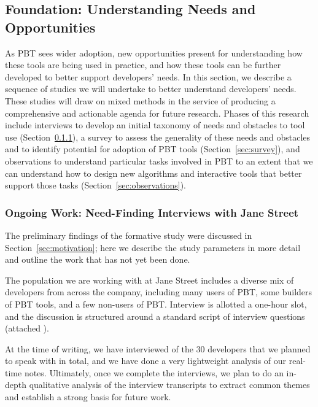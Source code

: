 \subsection{Foundation: Understanding Needs and Opportunities }

As PBT sees wider adoption, new opportunities present for understanding how
these tools are being used in practice, and how these tools can be further
developed to better support developers' needs. In this section, we describe a
sequence of studies we will undertake to better understand developers' needs.
These studies will draw on mixed methods in the service of producing a
comprehensive and actionable agenda for future research.  Phases of this
research include interviews to develop an initial taxonomy of needs and
obstacles to tool use (Section~\ref{sec:interviews}), a survey to assess the
generality of these needs and obstacles and to identify potential for adoption
of PBT tools (Section~\ref{sec:survey}), and observations to understand
particular tasks involved in PBT to an extent that we can understand how to
design new algorithms and interactive tools that better support those tasks
(Section~\ref{sec:observations}).

\subsubsection{Ongoing Work: Need-Finding Interviews with Jane Street}
\label{sec:interviews}

The preliminary findings of the formative study were discussed in
Section~\ref{sec:motivation}; here we describe the study parameters in more
detail and outline the work that has not yet been done.

The population we are working with at Jane Street includes a diverse mix of
developers from across the company, including many users of PBT, some builders
of PBT tools, and a few non-users of PBT. Interview is allotted a one-hour slot,
and the discussion is structured around a standard script of interview questions
(attached ).


At the time of writing, we have interviewed  of the 30 developers that we
planned to speak with in total, and we have done a very lightweight analysis of
our real-time notes. Ultimately, once we complete the interviews, we plan to do
an in-depth qualitative analysis of the interview transcripts to extract common
themes and establish a strong basis for future work.

